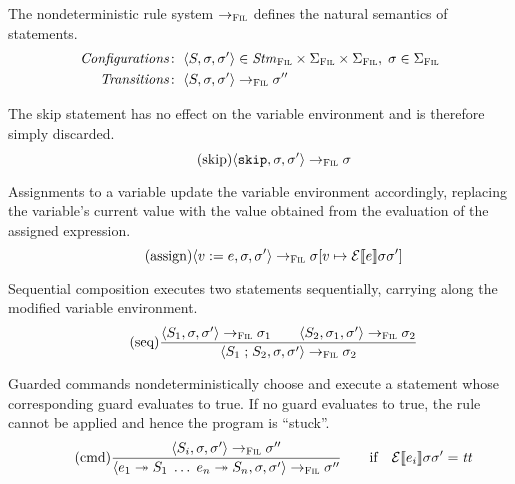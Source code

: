 \documentclass[a4paper,10pt,english]{article}
\begin{document}
The nondeterministic rule system $\rightarrow_{\textsc{Fil}}$ defines the natural semantics of statements.
\begin{align*}
	\mathit{Configurations} \colon & \;\langle S, \sigma, \sigma' \rangle \in \mathit{Stm}_\textsc{Fil} \times \Sigma_\textsc{Fil} \times
	\Sigma_\textsc{Fil}, \; \sigma \in \Sigma_\textsc{Fil}
	\\
	\mathit{Transitions} \colon & \;\langle S, \sigma, \sigma' \rangle \rightarrow_{\textsc{Fil}} \sigma''
\end{align*}

The skip statement has no effect on the variable environment and is therefore simply discarded.
\begin{equation*}
	\tag{skip}
	\langle \mathtt{skip}, \sigma, \sigma' \rangle
		\rightarrow_{\textsc{Fil}}
	\sigma
\end{equation*}

Assignments to a variable update the variable environment accordingly, replacing the variable's current value with the value
obtained from the evaluation of the assigned expression.
\begin{equation*}
	\tag{assign}
	\langle v\; \mathtt{:=}\; e, \sigma, \sigma' \rangle
		\rightarrow_{\textsc{Fil}}
	\sigma[v \mapsto \mathcal{E} \llbracket e \rrbracket \sigma \sigma']
\end{equation*}

Sequential composition executes two statements sequentially, carrying along the modified variable environment.
\begin{equation*}
	\tag{seq}
	\dfrac
	{
		\langle S_1, \sigma, \sigma' \rangle
			\rightarrow_{\textsc{Fil}}
		\sigma_1
		\qquad
		\langle S_2, \sigma_1, \sigma' \rangle
			\rightarrow_{\textsc{Fil}}
		\sigma_2
	}
	{
		\langle S_1 \; \mathtt{;} \; S_2, \sigma, \sigma' \rangle
			\rightarrow_{\textsc{Fil}}
		\sigma_2
	}
\end{equation*}

Guarded commands nondeterministically choose and execute a statement whose corresponding guard evaluates to true. If no guard
evaluates to true, the rule cannot be applied and hence the program is ``stuck''.
\begin{equation*}
	\tag{cmd}
	\dfrac
	{
		\langle S_i, \sigma, \sigma' \rangle
			\rightarrow_{\textsc{Fil}}
		\sigma''
	}
	{
		\langle e_1 \; \mathtt{\twoheadrightarrow} \; S_1 \; \ldots \; e_n \; \mathtt{\twoheadrightarrow} \; S_n, \sigma, \sigma' \rangle
			\rightarrow_{\textsc{Fil}}
		\sigma''
	}
	\qquad \text{if} \quad \mathcal{E} \llbracket e_i \rrbracket \sigma \sigma' = \mathit{tt}
\end{equation*}
\end{document}
